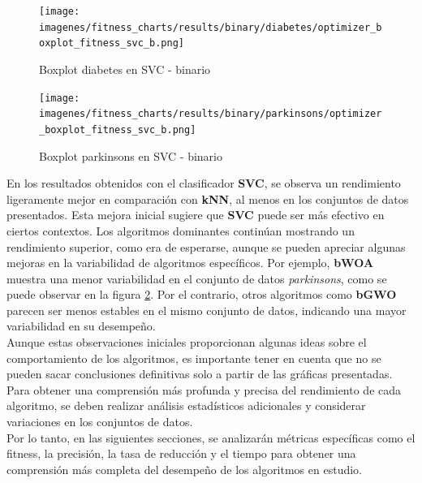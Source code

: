 \begin{figure}[htp]
    \centering
    \texttt{[image: imagenes/fitness\_charts/results/binary/diabetes/optimizer\_boxplot\_fitness\_svc\_b.png]}
    \caption{Boxplot diabetes en SVC - binario}
    \label{fig:boxplot_diabetessvc}
\end{figure}

\begin{figure}[htp]
    \centering
    \texttt{[image: imagenes/fitness\_charts/results/binary/parkinsons/optimizer\_boxplot\_fitness\_svc\_b.png]}
    \caption{Boxplot parkinsons en SVC - binario}
    \label{fig:boxplot_parkinsonssvc}
\end{figure}

En los resultados obtenidos con el clasificador \textbf{SVC}, se observa un rendimiento ligeramente mejor en comparación con \textbf{kNN}, al menos en los conjuntos de datos presentados. Esta mejora inicial sugiere que \textbf{SVC} puede ser más efectivo en ciertos contextos. Los algoritmos dominantes continúan mostrando un rendimiento superior, como era de esperarse, aunque se pueden apreciar algunas mejoras en la variabilidad de algoritmos específicos. Por ejemplo, \textbf{bWOA} muestra una menor variabilidad en el conjunto de datos \textit{parkinsons}, como se puede observar en la figura \ref{fig:boxplot_parkinsonssvc}. Por el contrario, otros algoritmos como \textbf{bGWO} parecen ser menos estables en el mismo conjunto de datos, indicando una mayor variabilidad en su desempeño.\\[6pt]
Aunque estas observaciones iniciales proporcionan algunas ideas sobre el comportamiento de los algoritmos, es importante tener en cuenta que no se pueden sacar conclusiones definitivas solo a partir de las gráficas presentadas. Para obtener una comprensión más profunda y precisa del rendimiento de cada algoritmo, se deben realizar análisis estadísticos adicionales y considerar variaciones en los conjuntos de datos.\\[6pt]
Por lo tanto, en las siguientes secciones, se analizarán métricas específicas como el fitness, la precisión, la tasa de reducción y el tiempo para obtener una comprensión más completa del desempeño de los algoritmos en estudio.

